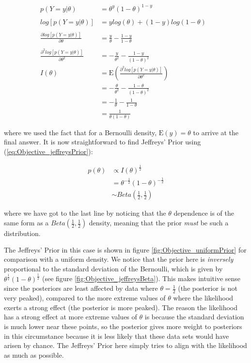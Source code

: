 \documentclass[11pt,fullpage]{book}
\begin{document}
\begin{align}
p(Y=y|\theta) &= \theta^y (1-\theta)^{1-y}\\
&\\
log\left[p(Y=y|\theta)\right] &= y log(\theta) + (1-y)log(1-\theta)\\
&\\
\frac{\partial log\left[p(Y=y|\theta)\right] }{\partial \theta} &= \frac{y}{\theta} - \frac{1-y}{1-\theta}\\
&\\
\frac{\partial^2 log\left[p(Y=y|\theta)\right] }{\partial \theta^2} &= -\frac{y}{\theta^2} - \frac{1-y}{(1-\theta)^2}
&\\
I(\theta) &= \mathrm{E}\left(\frac{\partial^2 log\left[p(Y=y|\theta)\right] }{\partial \theta^2}\right)\\
&= -\frac{\theta}{\theta^2} - \frac{1-\theta}{(1-\theta)^2}\\
&= -\frac{1}{\theta} - \frac{1}{1-\theta}\\
&= \frac{1}{\theta(1-\theta)}
\end{align}

where we used the fact that for a Bernoulli density, $\mathrm{E}(y)=\theta$ to arrive at the final answer. It is now straightforward to find Jeffreys' Prior using (\ref{eq:Objective_jeffreysPrior}):

\begin{align}
p(\theta) &\propto I(\theta)^{\frac{1}{2}}\\
&= \theta^{-\frac{1}{2}} (1-\theta)^{-\frac{1}{2}}\\
&\sim Beta\left(\frac{1}{2},\frac{1}{2}\right)
\end{align}

where we have got to the last line by noticing that the $\theta$ dependence is of the same form as a $Beta\left(\frac{1}{2},\frac{1}{2}\right)$ density, meaning that the prior \textit{must} be such a distribution.

The Jeffreys' Prior in this case is shown in figure \ref{fig:Objective_uniformPrior} for comparison with a uniform density. We notice that the prior here is \textit{inversely} proportional to the standard deviation of the Bernoulli, which is given by $\theta^\frac{1}{2}(1-\theta)^\frac{1}{2}$ (see figure \ref{fig:Objective_jeffreysBeta}). This makes intuitive sense since the posteriors are least affected by data where $\theta=\frac{1}{2}$ (the posterior is not very peaked), compared to the more extreme values of $\theta$ where the likelihood exerts a strong effect (the posterior is more peaked). The reason the likelihood has a strong effect at more extreme values of $\theta$ is because the standard deviation is much lower near these points, so the posterior gives more weight to posteriors in this circumstance because it is less likely that these data sets would have arisen by chance. The Jeffreys' Prior here simply tries to align with the likelihood as much as possible. 
\end{document}
